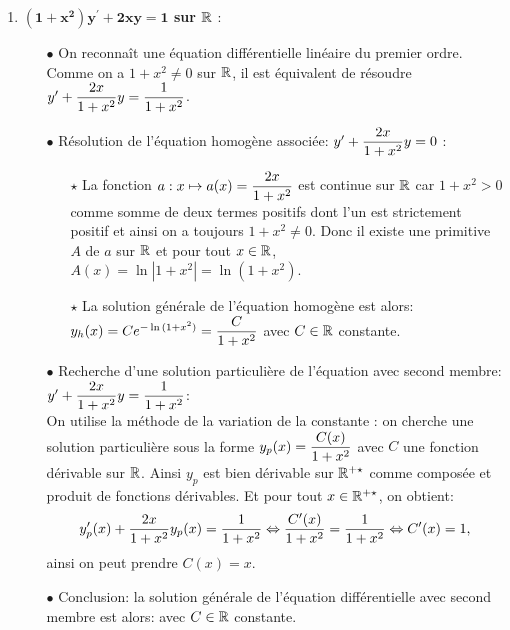 \documentclass[a4paper, 11pt,reqno]{article}
\begin{document}
\begin{correction}  \;

\begin{enumerate}

\item \textbf{$\mathbf{(1+x^2)y^{\prime}+2xy=1}$ sur $\mathbb{R}$} :\\
\begin{itemize}
\item[$\bullet$] On reconna\^{i}t une \'equation diff\'erentielle lin\'eaire du premier ordre. Comme on a $1+x^2\not=0$ sur $\mathbb{R}$, il est \'equivalent de r\'esoudre $y^{\prime}\displaystyle+\frac{2x}{1+x^2}y=\frac{1}{1+x^2}$.
\item[$\bullet$] R\'esolution de l'\'equation homog\`{e}ne associ\'ee: $y^{\prime}\displaystyle+\frac{2x}{1+x^2}y=0$ :\\
\begin{itemize}
\item[$\star$] La fonction $a: x\mapsto a(x)=\displaystyle\frac{2x}{1+x^2}$ est continue sur $\mathbb{R}$ car $1+x^2> 0$ comme somme de deux termes positifs dont l'un est strictement positif et ainsi on a toujours $1+x^2\not= 0$. Donc il existe une primitive $A$ de $a$ sur $\mathbb{R}$ et pour tout $x\in\mathbb{R}$, $A(x)=\ln{|1+x^2|}=\ln{(1+x^2)}$.
\item[$\star$] La solution g\'en\'erale de l'\'equation homog\`{e}ne est alors: $y_h(x)= Ce^{-\ln{(1+x^2)}}=\displaystyle\frac{C}{1+x^2}$ avec $C\in\mathbb{R}$ constante.
\end{itemize}
\item[$\bullet$] Recherche d'une solution particuli\`{e}re de l'\'equation avec second membre: $y^{\prime}\displaystyle+\frac{2x}{1+x^2}y=\frac{1}{1+x^2}$:\\
\noindent On utilise la m\'ethode de la variation de la constante : on cherche une solution particuli\`ere sous la forme $y_p(x) = \displaystyle\frac{C(x)}{1+x^2}$ avec $C$ une fonction d\'erivable sur $\mathbb{R}$. Ainsi $y_p$ est bien d\'erivable sur $\mathbb{R}^{+\star}$ comme compos\'ee et produit de fonctions d\'erivables. Et pour tout $x\in\mathbb{R}^{+\star}$, on obtient:
$$y^{\prime}_p(x)+\displaystyle\frac{2x}{1+x^2}y_p(x)=\displaystyle\frac{1}{1+x^2}\Leftrightarrow \frac{C'(x)}{1+x^2} = \frac{1}{1+x^2} \Leftrightarrow C'(x) = 1,$$
ainsi on peut prendre $C(x) = x$.
\item[$\bullet$] Conclusion: la solution g\'en\'erale de l'\'equation diff\'erentielle avec second membre est alors:
 avec $C\in\mathbb{R}$ constante.
\end{itemize}

\end{enumerate}
\end{correction}
\end{document}
